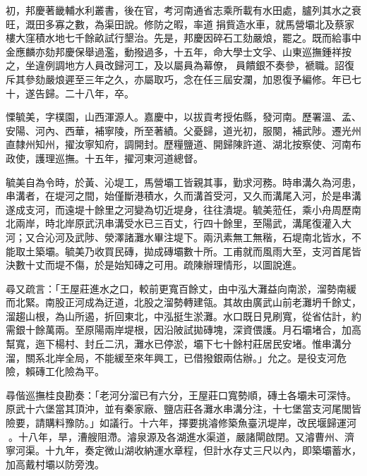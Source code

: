 \begin{pinyinscope}
初，邦慶著畿輔水利叢書，後在官，考河南通省志乘所載有水田處，臚列其水之衰旺，溉田多寡之數，為渠田說。修防之暇，率道捐貲造水車，就馬營壩北及蔡家樓大窪積水地七千餘畝試行墾治。先是，邦慶因碎石工劾嚴烺，罷之。既而給事中金應麟亦劾邦慶保舉過濫，動撥過多，十五年，命大學士文孚、山東巡撫鍾祥按之，坐違例調地方人員改歸河工，及以屬員為幕僚，員饋銀不奏參，褫職。詔復斥其參劾嚴烺遲至三年之久，亦屬取巧，念在任三屆安瀾，加恩復予編修。年已七十，遂告歸。二十八年，卒。

慄毓美，字樸園，山西渾源人。嘉慶中，以拔貢考授佑縣，發河南。歷署溫、孟、安陽、河內、西華，補寧陵，所至著績。父憂歸，道光初，服闋，補武陟。遷光州直隸州知州，擢汝寧知府，調開封。歷糧鹽道、開歸陳許道、湖北按察使、河南布政使，護理巡撫。十五年，擢河東河道總督。

毓美自為令時，於黃、沁堤工，馬營壩工皆親其事，勤求河務。時串溝久為河患，串溝者，在堤河之間，始僅斷港積水，久而溝首受河，又久而溝尾入河，於是串溝遂成支河，而遠堤十餘里之河變為切近堤身，往往潰堤。毓美蒞任，乘小舟周歷南北兩岸，時北岸原武汛串溝受水已三百丈，行四十餘里，至陽武，溝尾復灌入大河；又合沁河及武陟、滎澤諸灘水畢注堤下。兩汛素無工無稭，石堤南北皆水，不能取土築壩。毓美乃收買民磚，拋成磚壩數十所。工甫就而風雨大至，支河首尾皆決數十丈而堤不傷，於是始知磚之可用。疏陳辦理情形，以圖說進。

尋又疏言：「王屋莊進水之口，較前更寬百餘丈，由中泓大灘益向南淤，溜勢南緩而北緊。南股正河成為迂道，北股之溜勢轉建瓴。其故由廣武山前老灘坍千餘丈，溜趨山根，為山所遏，折回東北，中泓挺生淤灘。水口既日見刷寬，從省估計，約需銀十餘萬兩。至原陽兩岸堤根，因沿陂試拋磚塊，深資偎護。月石壩堵合，加高幫寬，迤下楊村、封丘二汛，灘水已停淤，壩下七十餘村莊居民安堵。惟串溝分溜，關系北岸全局，不能緩至來年興工，已借撥銀兩估辦。」允之。是役支河危險，賴磚工化險為平。

尋偕巡撫桂良勘奏：「老河分溜已有六分，王屋莊口寬勢順，磚土各壩未可深恃。原武十六堡當其頂沖，並有秦家廠、鹽店莊各灘水串溝分注，十七堡當支河尾閭皆險要，請購料豫防。」如議行。十六年，擇要挑濬修築魚臺汛堤岸，改民堰歸運河。十八年，旱，漕艘阻滯。濬泉源及各湖進水渠道，嚴諸閘啟閉。又濬曹州、濟寧河渠。十九年，奏定微山湖收納運水章程，但計水存丈三尺以內，即築壩蓄水，加高戴村壩以防旁洩。


\end{pinyinscope}
